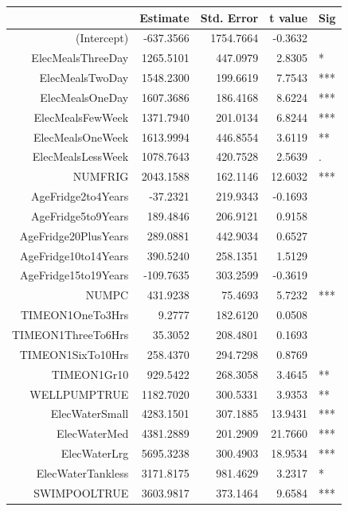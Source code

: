 \documentclass{article}
\begin{document}
\begin{longtable}{rrrrl}
  \hline
 & Estimate & Std. Error & t value & Sig \\ 
  \hline
(Intercept) & -637.3566 & 1754.7664 & -0.3632 &   \\ 
  ElecMealsThreeDay & 1265.5101 & 447.0979 & 2.8305 & * \\ 
  ElecMealsTwoDay & 1548.2300 & 199.6619 & 7.7543 & *** \\ 
  ElecMealsOneDay & 1607.3686 & 186.4168 & 8.6224 & *** \\ 
  ElecMealsFewWeek & 1371.7940 & 201.0134 & 6.8244 & *** \\ 
  ElecMealsOneWeek & 1613.9994 & 446.8554 & 3.6119 & ** \\ 
  ElecMealsLessWeek & 1078.7643 & 420.7528 & 2.5639 & . \\ 
  NUMFRIG & 2043.1588 & 162.1146 & 12.6032 & *** \\ 
  AgeFridge2to4Years & -37.2321 & 219.9343 & -0.1693 &   \\ 
  AgeFridge5to9Years & 189.4846 & 206.9121 & 0.9158 &   \\ 
  AgeFridge20PlusYears & 289.0881 & 442.9034 & 0.6527 &   \\ 
  AgeFridge10to14Years & 390.5240 & 258.1351 & 1.5129 &   \\ 
  AgeFridge15to19Years & -109.7635 & 303.2599 & -0.3619 &   \\ 
  NUMPC & 431.9238 & 75.4693 & 5.7232 & *** \\ 
  TIMEON1OneTo3Hrs & 9.2777 & 182.6120 & 0.0508 &   \\ 
  TIMEON1ThreeTo6Hrs & 35.3052 & 208.4801 & 0.1693 &   \\ 
  TIMEON1SixTo10Hrs & 258.4370 & 294.7298 & 0.8769 &   \\ 
  TIMEON1Gr10 & 929.5422 & 268.3058 & 3.4645 & ** \\ 
  WELLPUMPTRUE & 1182.7020 & 300.5331 & 3.9353 & ** \\ 
  ElecWaterSmall & 4283.1501 & 307.1885 & 13.9431 & *** \\ 
  ElecWaterMed & 4381.2889 & 201.2909 & 21.7660 & *** \\ 
  ElecWaterLrg & 5695.3238 & 300.4903 & 18.9534 & *** \\ 
  ElecWaterTankless & 3171.8175 & 981.4629 & 3.2317 & * \\ 
  SWIMPOOLTRUE & 3603.9817 & 373.1464 & 9.6584 & *** \\ 

\end{longtable}
\end{document}
